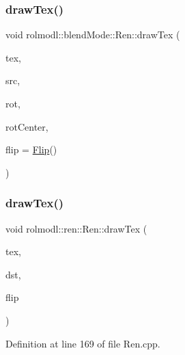 \subsubsection{\texorpdfstring{drawTex()}{drawTex()}\hspace{0.1cm}{\footnotesize\ttfamily [18/36]}}
{\footnotesize\ttfamily void rolmodl\+::blend\+Mode\+::\+Ren\+::draw\+Tex (\begin{DoxyParamCaption}\item[{Tex \&}]{tex,  }\item[{const \mbox{\hyperlink{structrolmodl_1_1blend_mode_1_1_src_rect_x_y}{Src\+Rect\+XY}}}]{src,  }\item[{const double}]{rot,  }\item[{const \mbox{\hyperlink{structrolmodl_1_1geom_1_1_pos}{geom\+::\+Pos}}}]{rot\+Center,  }\item[{const \mbox{\hyperlink{structrolmodl_1_1blend_mode_1_1_flip}{Flip}}}]{flip = {\ttfamily \mbox{\hyperlink{structrolmodl_1_1blend_mode_1_1_flip}{Flip}}()} }\end{DoxyParamCaption})}

\mbox{\label{classrolmodl_1_1blend_mode_1_1_ren_a3d435aeab5462eff98fcd63938c20349}} 
\subsubsection{\texorpdfstring{drawTex()}{drawTex()}\hspace{0.1cm}{\footnotesize\ttfamily [19/36]}}
{\footnotesize\ttfamily void rolmodl\+::ren\+::\+Ren\+::draw\+Tex (\begin{DoxyParamCaption}\item[{Tex \&}]{tex,  }\item[{const \mbox{\hyperlink{structrolmodl_1_1blend_mode_1_1_dst_rect_w_h}{Dst\+Rect\+WH}}}]{dst,  }\item[{const \mbox{\hyperlink{structrolmodl_1_1blend_mode_1_1_flip}{Flip}}}]{flip }\end{DoxyParamCaption})}



Definition at line 169 of file Ren.\+cpp.

\mbox{\label{classrolmodl_1_1blend_mode_1_1_ren_acd1bc13956f4751b163945ba290f1724}} 
